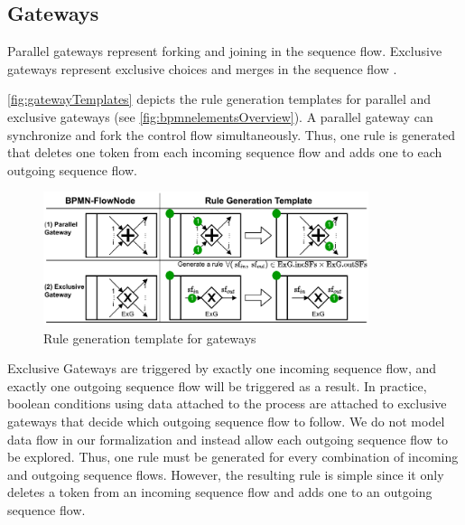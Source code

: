 \documentclass{lmcs} %
\begin{document}
\subsection{Gateways}
Parallel gateways represent forking and joining in the sequence flow.
Exclusive gateways represent exclusive choices and merges in the sequence flow \cite{objectmanagementgroupBusinessProcessModel2013}.


\autoref{fig:gatewayTemplates} depicts the rule generation templates for parallel and exclusive gateways (see \autoref{fig:bpmnelementsOverview}).
A parallel gateway can synchronize and fork the control flow simultaneously.
Thus, one rule is generated that deletes one token from each incoming sequence flow and adds one to each outgoing sequence flow.

\begin{figure}[ht]
    \centering
    \includegraphics[width=0.85\textwidth]{images/gateways_template.pdf}
    \caption{Rule generation template for gateways}
    \label{fig:gatewayTemplates}
\end{figure}

Exclusive Gateways are triggered by exactly one incoming sequence flow, and exactly one outgoing sequence flow will be triggered as a result.
In practice, boolean conditions using data attached to the process are attached to exclusive gateways that decide which outgoing sequence flow to follow.
We do not model data flow in our formalization and instead allow each outgoing sequence flow to be explored. 
Thus, one rule must be generated for every combination of incoming and outgoing sequence flows.
However, the resulting rule is simple since it only deletes a token from an incoming sequence flow and adds one to an outgoing sequence flow.
\end{document}
